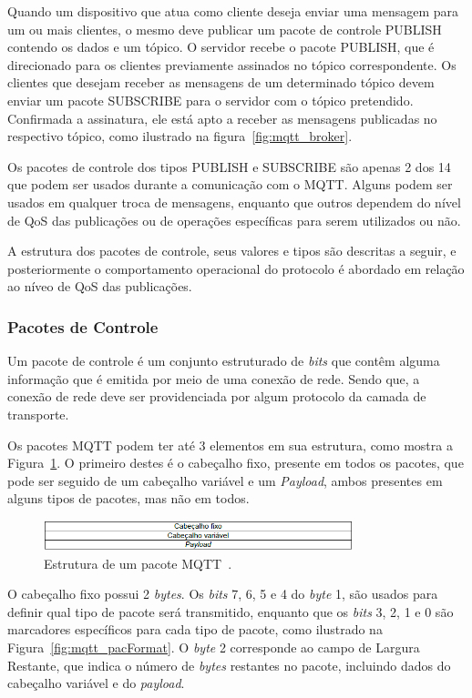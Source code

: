 Quando um dispositivo que atua como cliente deseja enviar uma mensagem para um ou mais clientes, o mesmo deve publicar um pacote de controle PUBLISH contendo os dados e um tópico. O servidor recebe o pacote PUBLISH, que é direcionado para os clientes previamente assinados no tópico correspondente. Os clientes que desejam receber as mensagens de um determinado tópico devem enviar um pacote SUBSCRIBE para o servidor com o tópico pretendido. Confirmada a assinatura, ele está apto a receber as mensagens publicadas no respectivo tópico, como ilustrado na figura~\ref{fig:mqtt_broker}.

Os pacotes de controle dos tipos  PUBLISH e SUBSCRIBE são apenas 2 dos 14 que podem ser usados durante a comunicação com o MQTT. Alguns podem ser usados em qualquer troca de mensagens, enquanto que outros dependem do nível de QoS das publicações ou de operações específicas para serem utilizados ou não.

A estrutura dos pacotes de controle, seus valores e tipos são descritas a seguir, e posteriormente o comportamento operacional do protocolo é abordado em relação ao níveo de QoS das publicações.

\subsubsection*{Pacotes de Controle} \label{sec:mqtt_format}

Um pacote de controle é um conjunto estruturado de \textit{bits} que contêm alguma informação que é emitida por meio de uma conexão de rede. Sendo que, a conexão de rede deve ser  providenciada por algum protocolo da camada de transporte.

Os pacotes MQTT podem ter até 3 elementos em sua estrutura, como mostra a Figura~\ref{fig:mqtt_format}. O primeiro destes é o cabeçalho fixo, presente em todos os pacotes, que pode ser seguido de um cabeçalho variável e um \textit{Payload}, ambos presentes em alguns tipos de pacotes, mas não em todos.

\begin{figure}[ht]
	\centering
	\includegraphics[width=0.8\textwidth]{imagens/mqtt_format.png}
	\caption{Estrutura de um pacote MQTT~\cite{mqttv3.1.1}.
		\label{fig:mqtt_format}}
\end{figure}
\FloatBarrier

O cabeçalho fixo possui 2 \textit{bytes}. Os \textit{bits} 7, 6, 5 e 4 do \textit{byte} 1, são usados para definir qual tipo de pacote será transmitido, enquanto que os \textit{bits} 3, 2, 1 e 0 são marcadores específicos para cada tipo de pacote, como ilustrado na Figura~\ref{fig:mqtt_pacFormat}. O \textit{byte} 2 corresponde ao campo de Largura Restante, que indica o número de \textit{bytes} restantes no pacote, incluindo dados do cabeçalho variável e do \textit{payload}.

